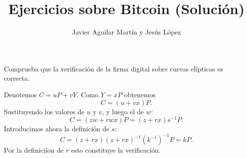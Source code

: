\documentclass[twoside]{article}
\begin{document}
\title{Ejercicios sobre Bitcoin (Solución)}
\author{Javier Aguilar Martín y Jesús López}
\maketitle


\begin{ejercicio}{1}
Comprueba que la verificación de la firma digital sobre curvas elípticas es correcta. 

\end{ejercicio}
\begin{solucion}
	 Denotemos $C=uP+vY$. Como $Y=xP$ obtenemos $$C=(u+vx)P.$$ Sustituyendo los valores de $u$ y $v$, y luego el de $w$: $$ C=(zw+rwx)P= (z+rx)s^{-1}P.$$ Introducimos ahora la definición de $s$: $$C=(z+rx)(z+rx)^{-1}(k^{-1})^{-1}P=kP.$$ Por la definiciíon de $r$ esto constituye la verificación.
	\end{solucion}
\end{document}
